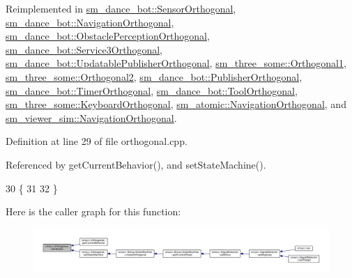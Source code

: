 Reimplemented in \hyperlink{classsm__dance__bot_1_1SensorOrthogonal_acdd1f07f01d995c31f9d7a44b6d218f3}{sm\+\_\+dance\+\_\+bot\+::\+Sensor\+Orthogonal}, \hyperlink{classsm__dance__bot_1_1NavigationOrthogonal_a2087b378406e35f0c7e6e31f21d37958}{sm\+\_\+dance\+\_\+bot\+::\+Navigation\+Orthogonal}, \hyperlink{classsm__dance__bot_1_1ObstaclePerceptionOrthogonal_a45afedc40daa31ef7d0ab65709cfacaf}{sm\+\_\+dance\+\_\+bot\+::\+Obstacle\+Perception\+Orthogonal}, \hyperlink{classsm__dance__bot_1_1Service3Orthogonal_a565ca9868dc8b5f7e59632ea9d44aa11}{sm\+\_\+dance\+\_\+bot\+::\+Service3\+Orthogonal}, \hyperlink{classsm__dance__bot_1_1UpdatablePublisherOrthogonal_af15b10bcebf79adc4d5bd85de808b13a}{sm\+\_\+dance\+\_\+bot\+::\+Updatable\+Publisher\+Orthogonal}, \hyperlink{classsm__three__some_1_1Orthogonal1_a20770e36bac2180c6e189cc07d873fdd}{sm\+\_\+three\+\_\+some\+::\+Orthogonal1}, \hyperlink{classsm__three__some_1_1Orthogonal2_a8f43a6b50b05fe24789c2cfe88719dbe}{sm\+\_\+three\+\_\+some\+::\+Orthogonal2}, \hyperlink{classsm__dance__bot_1_1PublisherOrthogonal_a09cff1848856d6e5f295b9efa7b735d2}{sm\+\_\+dance\+\_\+bot\+::\+Publisher\+Orthogonal}, \hyperlink{classsm__dance__bot_1_1TimerOrthogonal_a73193496f7e43010b477f00fb81f54b7}{sm\+\_\+dance\+\_\+bot\+::\+Timer\+Orthogonal}, \hyperlink{classsm__dance__bot_1_1ToolOrthogonal_a6305e62dbb969692773d510896fcfaca}{sm\+\_\+dance\+\_\+bot\+::\+Tool\+Orthogonal}, \hyperlink{classsm__three__some_1_1KeyboardOrthogonal_a3e1216abeba9eb4e5473e7aa8e426cfc}{sm\+\_\+three\+\_\+some\+::\+Keyboard\+Orthogonal}, \hyperlink{classsm__atomic_1_1NavigationOrthogonal_a3149566fdb2ca239d1cd181c9c13b5d3}{sm\+\_\+atomic\+::\+Navigation\+Orthogonal}, and \hyperlink{classsm__viewer__sim_1_1NavigationOrthogonal_a97f7e637ef4f0a0011400234a0ec101d}{sm\+\_\+viewer\+\_\+sim\+::\+Navigation\+Orthogonal}.



Definition at line 29 of file orthogonal.\+cpp.



Referenced by get\+Current\+Behavior(), and set\+State\+Machine().


\begin{DoxyCode}
30 \{
31 
32 \}
\end{DoxyCode}


Here is the caller graph for this function\+:
\nopagebreak
\begin{figure}[H]
\begin{center}
\leavevmode
\includegraphics[width=350pt]{classsmacc_1_1Orthogonal_a7a3da420b1554e20aea3ed01067df05c_icgraph}
\end{center}
\end{figure}



